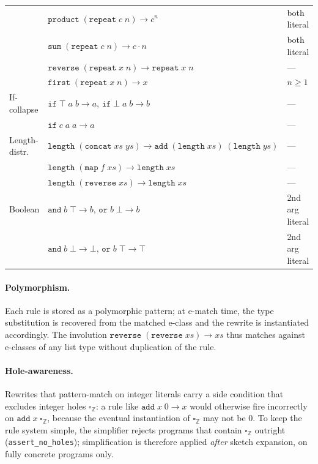 \documentclass[12pt]{article}
\begin{document}
\begin{table}[!htbp]
\begin{tabular}{lll}
              & $\mathtt{product}\;(\mathtt{repeat}\;c\;n) \to c^n$                                  & both literal \\
              & $\mathtt{sum}\;(\mathtt{repeat}\;c\;n) \to c \cdot n$                               & both literal \\
              & $\mathtt{reverse}\;(\mathtt{repeat}\;x\;n) \to \mathtt{repeat}\;x\;n$               & --- \\
              & $\mathtt{first}\;(\mathtt{repeat}\;x\;n) \to x$                                      & $n \geq 1$ \\
If-collapse   & $\mathtt{if}\;\top\;a\;b \to a$, \quad $\mathtt{if}\;\bot\;a\;b \to b$               & --- \\
              & $\mathtt{if}\;c\;a\;a \to a$                                                         & --- \\
Length-distr. & $\mathtt{length}\;(\mathtt{concat}\;\mathit{xs}\;\mathit{ys}) \to \mathtt{add}\;(\mathtt{length}\;\mathit{xs})\;(\mathtt{length}\;\mathit{ys})$ & --- \\
              & $\mathtt{length}\;(\mathtt{map}\;f\;\mathit{xs}) \to \mathtt{length}\;\mathit{xs}$  & --- \\
              & $\mathtt{length}\;(\mathtt{reverse}\;\mathit{xs}) \to \mathtt{length}\;\mathit{xs}$ & --- \\
Boolean       & $\mathtt{and}\;b\;\top \to b$, \quad $\mathtt{or}\;b\;\bot \to b$                   & 2nd arg literal \\
              & $\mathtt{and}\;b\;\bot \to \bot$, \quad $\mathtt{or}\;b\;\top \to \top$              & 2nd arg literal \\
\bottomrule
\end{tabular}
\end{table}

\paragraph{Polymorphism.} Each rule is stored as a polymorphic pattern; at e-match time, the type substitution is recovered from the matched e-class and the rewrite is instantiated accordingly. The involution $\mathtt{reverse}\;(\mathtt{reverse}\;\mathit{xs}) \to \mathit{xs}$ thus matches against e-classes of any list type without duplication of the rule.

\paragraph{Hole-awareness.} Rewrites that pattern-match on integer literals carry a side condition that excludes integer holes $\square_{\mathbb{Z}}$: a rule like $\mathtt{add}\;x\;0 \to x$ would otherwise fire incorrectly on $\mathtt{add}\;x\;\square_{\mathbb{Z}}$, because the eventual instantiation of $\square_{\mathbb{Z}}$ may not be $0$. To keep the rule system simple, the simplifier rejects programs that contain $\square_{\mathbb{Z}}$ outright (\texttt{assert\_no\_holes}); simplification is therefore applied \emph{after} sketch expansion, on fully concrete programs only.
\end{document}

